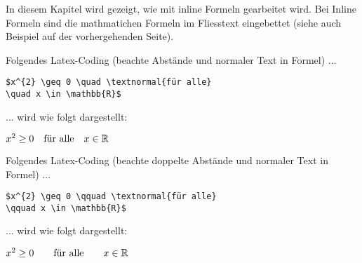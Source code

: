 In diesem Kapitel wird gezeigt, wie mit inline Formeln  gearbeitet wird. Bei Inline Formeln sind die mathmatichen Formeln im Fliesstext eingebettet (siehe auch Beispiel auf der vorhergehenden Seite).

\par\bigskip 
\par\bigskip 
\par\bigskip 
Folgendes Latex-Coding (beachte Abstände und normaler Text in Formel) ...

\begin{tcolorbox}[width=\textwidth,colback={light-gray},title={Latex-Text},colbacktitle=gray,coltitle=white]

\begin{verbatim}
$x^{2} \geq 0 \quad \textnormal{für alle} 
\quad x \in \mathbb{R}$
\end{verbatim}

\end{tcolorbox}

... wird wie folgt dargestellt: 

\begin{tcolorbox}[width=\textwidth,colback={light-gray},title={Print-Text},colbacktitle=gray,coltitle=white]

$x^{2} \geq 0 \quad \textnormal{für alle} 
\quad x \in \mathbb{R}$

\end{tcolorbox}


\par\bigskip 
\par\bigskip 
\par\bigskip 
\par\bigskip 
\par\bigskip 
Folgendes Latex-Coding (beachte doppelte Abstände und normaler Text in Formel) ...

\begin{tcolorbox}[width=\textwidth,colback={light-gray},title={Latex-Text},colbacktitle=gray,coltitle=white]

\begin{verbatim}
$x^{2} \geq 0 \qquad \textnormal{für alle} 
\qquad x \in \mathbb{R}$
\end{verbatim}

\end{tcolorbox}

... wird wie folgt dargestellt: 

\begin{tcolorbox}[width=\textwidth,colback={light-gray},title={Print-Text},colbacktitle=gray,coltitle=white]

$x^{2} \geq 0 \qquad \textnormal{für alle} 
\qquad x \in \mathbb{R}$

\end{tcolorbox}


